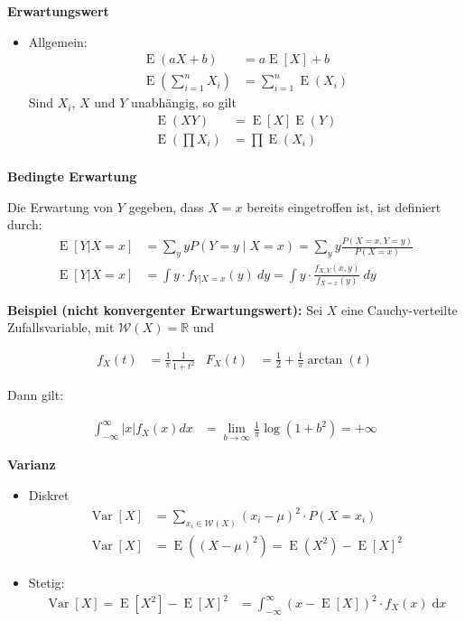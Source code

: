 \documentclass[25pt]{sciposter}
\newcommand{\R}{\mathbb{R}}
\newcommand{\W}{\mathcal{W}}
\newcommand{\Var}{\operatorname{Var}}
\newcommand{\E}{\operatorname{E}}
\newcommand{\rmd}{\mathrm{d}}
\newenvironment{method}[1]{\begin{mdframed}[backgroundcolor=blue!10,innertopmargin=15pt, innerbottommargin=15pt,nobreak=true]
		\textbf{#1 }
	}
	{ 
	\end{mdframed}
}
\begin{document}
\begin{multicols}{3}
\begin{method}{Erwartungswert}
\begin{itemize}
		\item Allgemein:
		\begin{align*}
	\E(aX+b) &= a\E[X] + b\\
	\E \left( \sum_{i=1}^n X_i \right) &= \sum_{i=1}^n \E(X_i)
		\end{align*}	
		Sind $X_i$, $X$ und $Y$ unabhängig, so gilt
		\begin{align*}
		\E(XY) &= \E[X]\E(Y)\\
		\E \left( \prod X_i \right) &= \prod \E(X_i)\\
		\end{align*}
		
	\end{itemize}
	

\end{method}

\begin{method}{Bedingte Erwartung}
	Die Erwartung von $Y$ gegeben, dass $X=x$ bereits eingetroffen ist, ist definiert durch:
	\begin{align*}
	\E[Y|X=x] &= \sum _{y}yP(Y=y\mid X=x)=\sum _{y}y{\frac {P(X=x,Y=y)}{P(X=x)}}\\
	\E[Y|X=x] &= \int y\cdot  f_{Y|X=x}(y)\  dy = \int y\cdot  \frac{f_{X,Y}(x,y)}{f_{X=x}(y)} \ dy
	\end{align*}
\end{method}


\textbf{Beispiel (nicht konvergenter Erwartungswert):}
Sei $X$ eine Cauchy-verteilte Zufallsvariable, mit $\W(X) = \R$ und

\begin{align*}
f_X(t) &= \frac{1}{\pi} \frac{1}{1+t^2}
& 
F_X(t) &= \frac{1}{2} + \frac{1}{\pi}\arctan(t)
\end{align*}

Dann gilt:

\begin{align*}
\int_{-\infty}^\infty |x|f_X(x) dx &= \lim\limits_{b\to\infty} \frac{1}{\pi}\log(1+b^2) = +\infty
\end{align*}




\begin{method}{Varianz}
\begin{itemize}
\item Diskret
		\begin{align*}
		\Var[X] &= \sum_{x_i \in \mathcal{W}(X)} (x_i - \mu)^2 \cdot P(X=x_i) \\
\Var[X] &= \E((X - \mu)^2) = \E(X^2) - \E[X]^2
	\end{align*}
\item Stetig:
	\begin{align*}
\Var[X] =  \E{[X^2]} - \E{[X]}^2  &= \int_{-\infty}^{\infty} (x - \E[X])^2 \cdot f_X(x) \; \rmd x
\end{align*}


\end{itemize}
\end{method}
\end{multicols}
\end{document}
